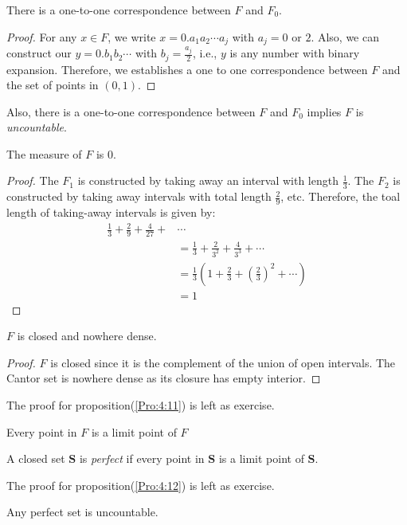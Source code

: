 \begin{proposition}
There is a one-to-one correspondence between $F$ and $F_0$.
\end{proposition}
\begin{proof}
For any $x\in F$, we write $x=0.a_1a_2\cdots a_j$ with $a_j=0$ or $2$. Also, we can construct our $y=0.b_1b_2\cdots$ with $b_j=\frac{a_j}{2}$, i.e., $y$ is any number with binary expansion. Therefore, we establishes a one to one correspondence between $F$ and the set of points in $(0,1).$
\end{proof}
Also, there is a one-to-one correspondence between $F$ and $F_0$ implies $F$ is \emph{uncountable}.
\begin{proposition}
The measure of $F$ is $0$.
\end{proposition}
\begin{proof}
The $F_1$ is constructed by taking away an interval with length $\frac{1}{3}$. The $F_2$ is constructed by taking away intervals with total length $\frac{2}{9}$, etc. Therefore, the toal length of taking-away intervals is given by:
\begin{align*}
\frac{1}{3}+\frac{2}{9}+\frac{4}{27}+&\cdots\\
&=\frac{1}{3}+\frac{2}{3^2}+\frac{4}{3^3}+\cdots\\
&=\frac{1}{3}(1+\frac{2}{3}+(\frac{2}{3})^2+\cdots)\\
&=1
\end{align*}
\end{proof}
\begin{proposition}
$F$ is closed and nowhere dense.
\end{proposition}
\begin{proof}
$F$ is closed since it is the complement of the union of open intervals. The Cantor set is nowhere dense as its closure has empty interior.
\end{proof}
The proof for proposition(\ref{Pro:4:11}) is left as exercise.
\begin{proposition}\label{Pro:4:11}
Every point in $F$ is a limit point of $F$
\end{proposition}
\begin{definition}[Perfect]
A closed set $\bm S$ is \emph{perfect} if every point in $\bm S$ is a limit point of $\bm S$.
\end{definition}
The proof for proposition(\ref{Pro:4:12}) is left as exercise.
\begin{proposition}\label{Pro:4:12}
Any perfect set is uncountable.
\end{proposition}















